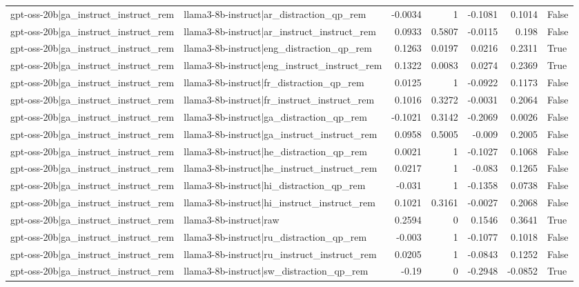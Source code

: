 \begin{table}
\begin{tabular}{l l r r r r l}
gpt-oss-20b|ga_instruct_instruct_rem & llama3-8b-instruct|ar_distraction_qp_rem & -0.0034 & 1 & -0.1081 & 0.1014 & False \\
gpt-oss-20b|ga_instruct_instruct_rem & llama3-8b-instruct|ar_instruct_instruct_rem & 0.0933 & 0.5807 & -0.0115 & 0.198 & False \\
gpt-oss-20b|ga_instruct_instruct_rem & llama3-8b-instruct|eng_distraction_qp_rem & 0.1263 & 0.0197 & 0.0216 & 0.2311 & True \\
gpt-oss-20b|ga_instruct_instruct_rem & llama3-8b-instruct|eng_instruct_instruct_rem & 0.1322 & 0.0083 & 0.0274 & 0.2369 & True \\
gpt-oss-20b|ga_instruct_instruct_rem & llama3-8b-instruct|fr_distraction_qp_rem & 0.0125 & 1 & -0.0922 & 0.1173 & False \\
gpt-oss-20b|ga_instruct_instruct_rem & llama3-8b-instruct|fr_instruct_instruct_rem & 0.1016 & 0.3272 & -0.0031 & 0.2064 & False \\
gpt-oss-20b|ga_instruct_instruct_rem & llama3-8b-instruct|ga_distraction_qp_rem & -0.1021 & 0.3142 & -0.2069 & 0.0026 & False \\
gpt-oss-20b|ga_instruct_instruct_rem & llama3-8b-instruct|ga_instruct_instruct_rem & 0.0958 & 0.5005 & -0.009 & 0.2005 & False \\
gpt-oss-20b|ga_instruct_instruct_rem & llama3-8b-instruct|he_distraction_qp_rem & 0.0021 & 1 & -0.1027 & 0.1068 & False \\
gpt-oss-20b|ga_instruct_instruct_rem & llama3-8b-instruct|he_instruct_instruct_rem & 0.0217 & 1 & -0.083 & 0.1265 & False \\
gpt-oss-20b|ga_instruct_instruct_rem & llama3-8b-instruct|hi_distraction_qp_rem & -0.031 & 1 & -0.1358 & 0.0738 & False \\
gpt-oss-20b|ga_instruct_instruct_rem & llama3-8b-instruct|hi_instruct_instruct_rem & 0.1021 & 0.3161 & -0.0027 & 0.2068 & False \\
gpt-oss-20b|ga_instruct_instruct_rem & llama3-8b-instruct|raw & 0.2594 & 0 & 0.1546 & 0.3641 & True \\
gpt-oss-20b|ga_instruct_instruct_rem & llama3-8b-instruct|ru_distraction_qp_rem & -0.003 & 1 & -0.1077 & 0.1018 & False \\
gpt-oss-20b|ga_instruct_instruct_rem & llama3-8b-instruct|ru_instruct_instruct_rem & 0.0205 & 1 & -0.0843 & 0.1252 & False \\
gpt-oss-20b|ga_instruct_instruct_rem & llama3-8b-instruct|sw_distraction_qp_rem & -0.19 & 0 & -0.2948 & -0.0852 & True \\

\end{tabular}
\end{table}
